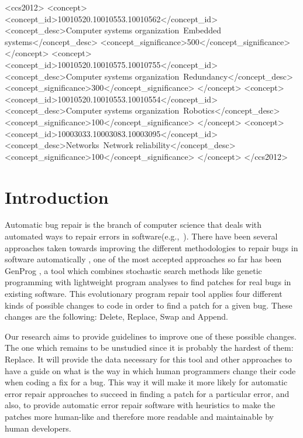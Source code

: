 \documentclass{sig-alternate-05-2015}
\begin{document}
%
%
\begin{CCSXML}
<ccs2012>
 <concept>
  <concept_id>10010520.10010553.10010562</concept_id>
  <concept_desc>Computer systems organization~Embedded systems</concept_desc>
  <concept_significance>500</concept_significance>
 </concept>
 <concept>
  <concept_id>10010520.10010575.10010755</concept_id>
  <concept_desc>Computer systems organization~Redundancy</concept_desc>
  <concept_significance>300</concept_significance>
 </concept>
 <concept>
  <concept_id>10010520.10010553.10010554</concept_id>
  <concept_desc>Computer systems organization~Robotics</concept_desc>
  <concept_significance>100</concept_significance>
 </concept>
 <concept>
  <concept_id>10003033.10003083.10003095</concept_id>
  <concept_desc>Networks~Network reliability</concept_desc>
  <concept_significance>100</concept_significance>
 </concept>
</ccs2012>  
\end{CCSXML}


%
%

%
%
\printccsdesc



\section{Introduction}



Automatic bug repair is the branch of computer science that deals with automated ways to repair errors in software(e.g.,~\cite{kim2013,legoues2012,Mechtaev15,Long2016}). There have been several approaches taken towards improving the different methodologies to repair bugs in software automatically \cite{dongsun}\cite{weimer}\cite{claire} \cite{kai}, one of the most accepted approaches so far has been GenProg \cite{weimer}\cite{claire}, a tool which combines stochastic search methods like genetic programming with lightweight program analyses to find patches for real bugs in existing software. This evolutionary program repair tool applies four different kinds of possible changes to code in order to find a patch for a given bug. These changes are the following: Delete, Replace, Swap and Append.

Our research aims to provide guidelines to improve one of these possible changes. The one which remains to be unstudied since it is probably the hardest of them: Replace. It will provide the data necessary for this tool and other approaches to have a guide on what is the way in which human programmers change their code when coding a fix for a bug. This way it will make it more likely for automatic error repair approaches to succeed in finding a patch for a particular error, and also, to provide automatic error repair software with heuristics to make the patches more human-like and therefore more readable and maintainable by human developers.
\end{document}
